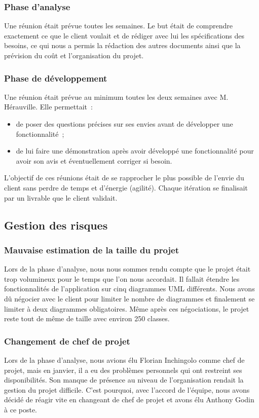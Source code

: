 \documentclass[hidelinks, 10pt,a4paper]{article}
\begin{document}
    \subsubsection{Phase d'analyse}
      Une réunion était prévue toutes les semaines. Le but était de comprendre exactement ce que le client voulait et de
      rédiger avec lui les spécifications des besoins, ce qui nous a permis la rédaction des autres documents
      ainsi que la prévision du coût et l'organisation du projet.
    
    \subsubsection{Phase de développement}
      Une réunion était prévue au minimum toutes les deux semaines avec M. Hérauville. Elle permettait~:
      \begin{itemize}
       \item de poser des questions précises sur ses envies avant de développer une fonctionnalité~;
       \item de lui faire une démonstration après avoir développé une fonctionnalité pour avoir son avis et éventuellement corriger si besoin.
      \end{itemize}
      L'objectif de ces réunions était de se rapprocher le plus possible de l'envie du client sans perdre de temps et d'énergie (agilité).
      Chaque itération se finalisait par un livrable que le client validait.
    
  \subsection{Gestion des risques}
    
     \subsubsection{Mauvaise estimation de la taille du projet}
	Lors de la phase d'analyse, nous nous sommes rendu compte que le projet était trop volumineux
	pour le temps que l'on nous accordait.
	Il fallait étendre les fonctionnalités de l'application sur cinq diagrammes UML différents.
	Nous avons dû négocier avec le client pour limiter le nombre de diagrammes et finalement se limiter à deux diagrammes obligatoires.
	Même après ces négociations, le projet reste tout de même de taille avec environ 250 classes.
	
      \subsubsection{Changement de chef de projet}
	Lors de la phase d'analyse, nous avions élu Florian Inchingolo comme chef de projet, mais en janvier, il a eu des problèmes personnels qui ont restreint ses disponibilités.
	Son manque de présence au niveau de l'organisation rendait la gestion du projet difficile.
	C'est pourquoi, avec l'accord de l'équipe, nous avons décidé de réagir vite en changeant de chef de projet et avons élu
	Anthony Godin à ce poste.
      
\end{document}
